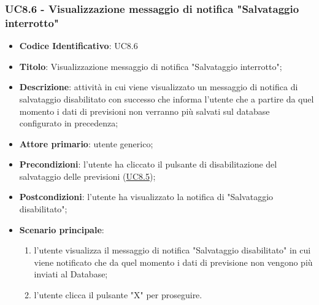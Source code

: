 	\subsubsection{UC8.6 - Visualizzazione messaggio di notifica "Salvataggio interrotto"}
	\begin{itemize}
			\item\textbf{Codice Identificativo}: UC8.6
			\item\textbf{Titolo}: Visualizzazione messaggio di notifica "Salvataggio interrotto";
			\item\textbf{Descrizione}: attività in cui viene visualizzato un messaggio di notifica di salvataggio disabilitato con successo che informa l'utente che a partire da quel momento i dati di previsioni non verranno più salvati sul database configurato in precedenza;
			\item\textbf{Attore primario}: utente generico;
			\item\textbf{Precondizioni}: l'utente ha cliccato il pulsante di disabilitazione del salvataggio delle previsioni (\hyperref[par:UC8.5]{UC8.5});
			\item\textbf{Postcondizioni}: l'utente ha visualizzato la notifica di "Salvataggio disabilitato";
			\item\textbf{Scenario principale}:
				\begin{enumerate}
					\item l'utente visualizza il messaggio di notifica "Salvataggio disabilitato" in cui viene notificato che da quel momento i dati di previsione non vengono più inviati al Database;
					\item l'utente clicca il pulsante "X" per proseguire.		
				\end{enumerate}		
		\end{itemize}
		



	\label{par:UC9}
